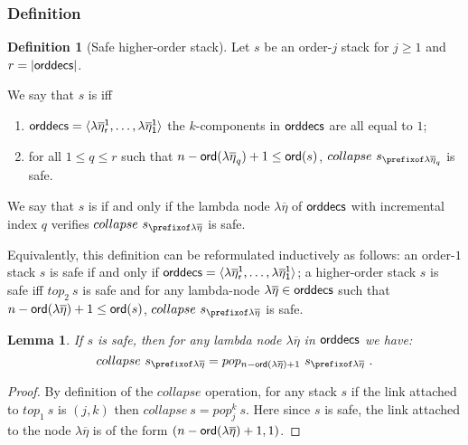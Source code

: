 \documentclass{article}
\newtheorem{lemma}{Lemma}[section]
\theoremstyle{remark}
\theoremstyle{definition}
\newtheorem{definition}{Definition}[section]
\newcommand\orddec{\sf orddec}
\begin{document}
\subsubsection{Definition}

\begin{definition}[Safe higher-order stack]
\label{dfn:safestack} Let $s$ be an order-$j$ stack for $j\geq1$ and $r
= |\orddec{s}|$.

We say that $s$ is  iff
    \begin{enumerate}[1.]
    \item $\orddec{s} = \langle \lambda \overline\eta_r^1, \ldots ,
    \lambda \overline{\eta}_1^1 \rangle$ \ie the $k$-components in $\orddec{s}$ are all equal to $1$;
    \item for all $1 \leq q \leq r$ such that $n-{\sf ord}(\lambda \overline\eta_q)+1 \leq {\sf ord}(s)$,
    $collapse~s_{\prefixof \lambda\overline\eta_q}$ is safe.
    \end{enumerate}

We say that $s$ is  if and only if the lambda node
$\lambda\overline\eta$ of $\orddec{s}$ with incremental index $q$ verifies
    $collapse~s_{\prefixof \lambda\overline\eta}$ is safe.
\end{definition}

Equivalently, this definition can be reformulated inductively as follows:
an order-$1$ stack $s$ is safe if and only if $\orddec{s} = \langle \lambda \overline{\eta}_r^1, \ldots , \lambda \overline{\eta}_1^1 \rangle$;
a higher-order stack $s$ is safe iff $top_2~s$ is safe and
for any lambda-node $\lambda\overline\eta \in \orddec{s}$ such that $n-{\sf ord}(\lambda \overline{\eta})+1 \leq {\sf ord}(s)$,
    $collapse~s_{\prefixof\lambda\overline\eta}$ is safe.


\begin{lemma}
\label{lem:safecollapsesimulation}
If $s$ is safe, then for any lambda node $\lambda\overline\eta$ in $\orddec{s}$ we have:
$$collapse~s_{\prefixof\lambda\overline\eta} = pop_{n-\ord{\lambda\overline\eta}+1} ~s_{\prefixof\lambda\overline\eta} \ . $$
\end{lemma}

\begin{proof}
By definition of the $collapse$ operation, for any stack $s$ if the link attached to $top_1~s$ is $(j,k)$ then $collapse~s = pop_j^k~s$. Here since $s$ is safe, the link attached to the node $\lambda\overline\eta$ is of the form
$(n-{\sf ord}(\lambda\overline\eta)+1,1)$.
\end{proof}
\end{document}
